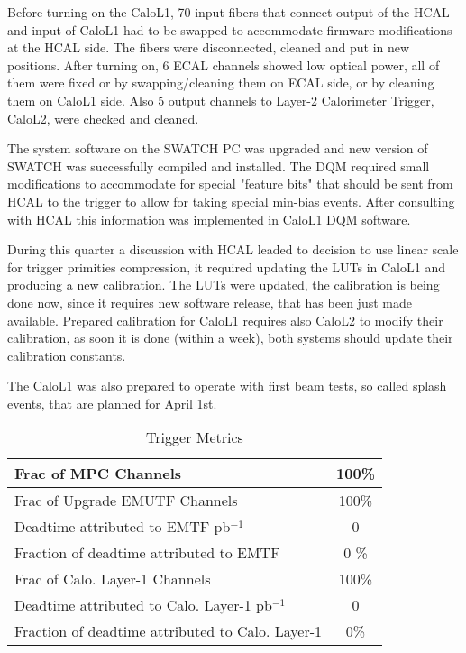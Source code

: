 \documentclass[12pt]{article}
\begin{document}
Before turning on the CaloL1, 70 input fibers that connect output of the HCAL and input of CaloL1 had to be swapped to accommodate firmware modifications at the HCAL side.
The fibers were disconnected, cleaned and put in new positions. After turning on, 6 ECAL channels showed low optical power, all of them were fixed or by swapping/cleaning them 
on ECAL side, or by cleaning them on CaloL1 side. Also 5 output channels to Layer-2 Calorimeter Trigger, CaloL2,  were checked and cleaned.

The system software on the SWATCH PC was upgraded and new version of SWATCH was successfully compiled and installed. The DQM required small modifications to accommodate 
for special "feature bits" that should be sent from HCAL to the trigger to allow for taking special min-bias events. After consulting with HCAL this information was implemented
in CaloL1 DQM software. 

During this quarter a discussion with HCAL leaded to decision to use linear scale for trigger primities compression, it required updating the LUTs in CaloL1 and producing a new 
calibration. The LUTs were updated, the calibration is being done now, since it requires new software release, that has been just made available. Prepared calibration for CaloL1
requires also CaloL2 to modify their calibration, as soon it is done (within a week), both systems should update their calibration constants.

The CaloL1 was also prepared to operate with first beam tests, so called splash events, that are planned for April 1st.

\begin{table}[htp]
\caption{Trigger Metrics}
\begin{center}
\begin{tabular}{|l|c|}
\hline
Frac of MPC Channels&  100\% \\
\hline
Frac of Upgrade EMUTF Channels&  100\% \\
\hline
Deadtime attributed to EMTF pb$^{-1}$ &  0 \\
Fraction of deadtime attributed to EMTF& 0 \% \\
\hline
Frac of Calo. Layer-1 Channels & 100\% \\
\hline
Deadtime attributed to Calo. Layer-1 pb$^{-1}$ &  0 \\
Fraction of deadtime attributed to Calo. Layer-1&  0\% \\
\hline
\end{tabular}
\end{center}
\label{TriggerMetrics}
\end{table}%
 
\end{document}
